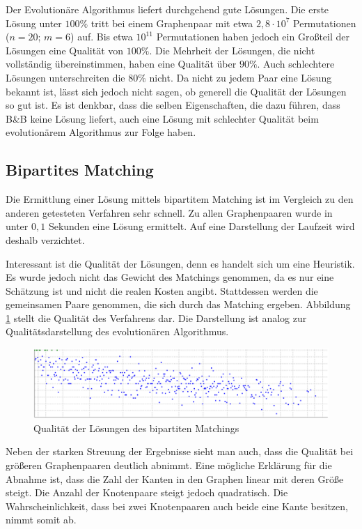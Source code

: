 Der Evolutionäre Algorithmus liefert durchgehend gute Lösungen. Die erste Lösung unter 
$100\%$ tritt bei einem Graphenpaar mit etwa $2{,}8 \cdot 10^7$ Permutationen ($n=20$; $m=6$) 
auf. Bis etwa $10^{11}$ Permutationen haben jedoch ein Großteil der Lösungen eine 
Qualität von $100\%$. Die Mehrheit der Lösungen, die nicht vollständig übereinstimmen, 
haben eine Qualität über $90\%$. Auch schlechtere Lösungen unterschreiten die $80\%$ 
nicht. Da nicht zu jedem Paar eine Lösung bekannt ist, lässt sich jedoch nicht sagen, 
ob generell die Qualität der Lösungen so gut ist. Es ist denkbar, dass die selben 
Eigenschaften, die dazu führen, dass B\&B keine Lösung liefert, auch eine Lösung 
mit schlechter Qualität beim evolutionärem Algorithmus zur Folge haben.

\subsection{Bipartites Matching}
Die Ermittlung einer Lösung mittels bipartitem Matching ist im Vergleich zu den anderen 
getesteten Verfahren sehr schnell. Zu allen Graphenpaaren wurde in unter $0{,}1$ Sekunden 
eine Lösung ermittelt. Auf eine Darstellung der Laufzeit wird deshalb verzichtet. 

Interessant ist die Qualität der Lösungen, denn es handelt sich um eine Heuristik. Es 
wurde jedoch nicht das Gewicht des Matchings genommen, da es nur eine Schätzung ist und nicht 
die realen Kosten angibt. Stattdessen werden die gemeinsamen Paare genommen, 
die sich durch das Matching ergeben. Abbildung \ref{pic:BipQuali} stellt die Qualität 
des Verfahrens dar. Die Darstellung ist analog zur Qualitätsdarstellung des evolutionären 
Algorithmus. 

\begin{figure}[htb]
\centering
\includegraphics[width=\linewidth,height=\textheight,
keepaspectratio]{bilder/bipQuali}
\caption{Qualität der Lösungen des bipartiten Matchings}
\label{pic:BipQuali}
\end{figure}

Neben der starken Streuung der Ergebnisse sieht man auch, dass die Qualität bei größeren 
Graphenpaaren deutlich abnimmt. Eine mögliche Erklärung für die Abnahme ist, dass die 
Zahl der Kanten in den Graphen linear mit deren Größe steigt. Die Anzahl der Knotenpaare 
steigt jedoch quadratisch. Die Wahrscheinlichkeit, dass bei zwei Knotenpaaren auch beide 
eine Kante besitzen, nimmt somit ab.

